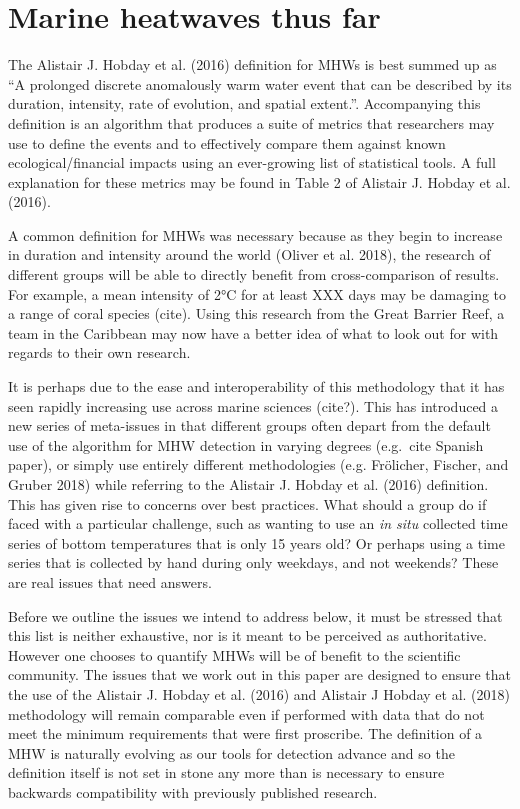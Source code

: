 \documentclass[]{article}
\begin{document}
\section{Marine heatwaves thus far}\label{marine-heatwaves-thus-far}

The Alistair J. Hobday et al. (2016) definition for MHWs is best summed
up as ``A prolonged discrete anomalously warm water event that can be
described by its duration, intensity, rate of evolution, and spatial
extent.''. Accompanying this definition is an algorithm that produces a
suite of metrics that researchers may use to define the events and to
effectively compare them against known ecological/financial impacts
using an ever-growing list of statistical tools. A full explanation for
these metrics may be found in Table 2 of Alistair J. Hobday et al.
(2016).

A common definition for MHWs was necessary because as they begin to
increase in duration and intensity around the world (Oliver et al.
2018), the research of different groups will be able to directly benefit
from cross-comparison of results. For example, a mean intensity of 2°C
for at least XXX days may be damaging to a range of coral species
(cite). Using this research from the Great Barrier Reef, a team in the
Caribbean may now have a better idea of what to look out for with
regards to their own research.

It is perhaps due to the ease and interoperability of this methodology
that it has seen rapidly increasing use across marine sciences (cite?).
This has introduced a new series of meta-issues in that different groups
often depart from the default use of the algorithm for MHW detection in
varying degrees (e.g.~cite Spanish paper), or simply use entirely
different methodologies (e.g. Frölicher, Fischer, and Gruber 2018) while
referring to the Alistair J. Hobday et al. (2016) definition. This has
given rise to concerns over best practices. What should a group do if
faced with a particular challenge, such as wanting to use an \emph{in
situ} collected time series of bottom temperatures that is only 15 years
old? Or perhaps using a time series that is collected by hand during
only weekdays, and not weekends? These are real issues that need
answers.

Before we outline the issues we intend to address below, it must be
stressed that this list is neither exhaustive, nor is it meant to be
perceived as authoritative. However one chooses to quantify MHWs will be
of benefit to the scientific community. The issues that we work out in
this paper are designed to ensure that the use of the Alistair J. Hobday
et al. (2016) and Alistair J Hobday et al. (2018) methodology will
remain comparable even if performed with data that do not meet the
minimum requirements that were first proscribe. The definition of a MHW
is naturally evolving as our tools for detection advance and so the
definition itself is not set in stone any more than is necessary to
ensure backwards compatibility with previously published research.
\end{document}
